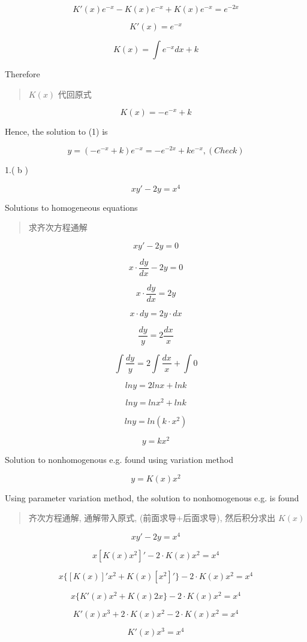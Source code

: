 \documentclass[
]{article}
\begin{document}
\[K'(x)e^{-x}- K(x)e^{-x} + K(x)e^{-x} = e^{-2x}\]

\[K'(x) = e^{-x}\]

\[K(x) = \int e^{-x}dx+k\]

Therefore

\begin{quote}
\(K(x)\) 代回原式
\end{quote}

\[K(x)=-e^{-x}+ k\]

Hence, the solution to (1) is

\[y = (-e^{-x}+k)e^{-x}=-e^{-2x}+ke^{-x} ,(Check)\]

1.( b )

\[xy' - 2y =x^4\]

Solutions to homogeneous equations

\begin{quote}
求齐次方程通解
\end{quote}

\[xy' - 2y = 0\]

\[x · \frac{dy}{dx} - 2y = 0\]

\[x · \frac{dy}{dx}  = 2y\]

\[x · dy =  2y · dx\]

\[\frac{dy}{y}= 2\frac{dx}{x}\]

\[\int \frac{dy}{y} = 2 \int{\frac{dx}{x} + \int 0 }\]

\[ln y = 2lnx + ln k\]

\[ln y = ln x^2 + lnk\]

\[ln y = ln ( k·x^2 )\]

\[y = kx^2\]

Solution to nonhomogenous e.g. found using variation method

\[y = K(x)x^2\]

Using parameter variation method, the solution to nonhomogenous e.g. is
found

\begin{quote}
齐次方程通解, 通解带入原式, (前面求导+后面求导), 然后积分求出 \(K(x)\)
\end{quote}

\[xy' - 2y =x^4\]

\[x [K(x)x^2]' -2 ·K(x)x^2 = x^4\]

\[x \{ [K(x)]'x^2 + K(x)[x^2]'\} -2 ·K(x)x^2 = x^4\]

\[x \{ K'(x)x^2 + K(x)2x\} -2 ·K(x)x^2 = x^4\]

\[K'(x)x^3 + 2·K(x)x^2 -2 ·K(x)x^2 = x^4\]

\[K'(x) x^3 = x^4\]
\end{document}
